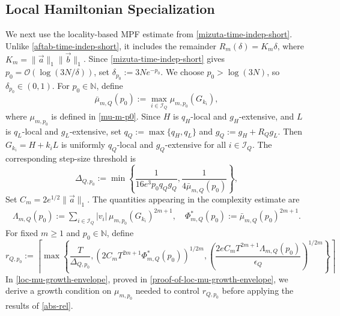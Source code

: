 \documentclass[10pt,reqno]{article}
\numberwithin{equation}{section}
\theoremstyle{plain}
\theoremstyle{definition}
\begin{document}
\subsection{Local Hamiltonian Specialization}\label{spec-mizuta}
We next use the locality-based MPF estimate from \cref{mizuta-time-indep-short}. Unlike \cref{aftab-time-indep-short}, it includes the remainder \(R_m(\delta)=K_m\delta\), where \(K_m=\|\vec a\|_1\|\vec b\|_1\). Since \cref{mizuta-time-indep-short} gives \(p_0=\mathcal O(\log(3N/\delta))\), set \(\delta_{p_0}:=3Ne^{-p_0}\). We choose \(p_0>\log(3N)\), so \(\delta_{p_0}\in(0,1)\). For \(p_0\in\mathbb N\), define
\begin{equation}\label{loc-mu-bar-def}
\bar\mu_{m,Q}(p_0) := \max_{i\in\mathcal I_Q} \mu_{m,p_0}(G_{k_i}), 
\end{equation}
where \(\mu_{m,p_0}\) is defined in \cref{mu-m-p0}.  Since \(H\) is \(q_H\)-local and \(g_H\)-extensive, and \(L\) is \(q_L\)-local and \(g_L\)-extensive, set \(q_Q := \max\{q_H,q_L\}\) and \(g_Q := g_H + R_Q g_L\). Then \(G_{k_i}=H+k_iL\) is uniformly \(q_Q\)-local and \(g_Q\)-extensive for all \(i\in\mathcal I_Q\). The corresponding step-size threshold is
\begin{equation}\label{loc-step-size}
\Delta_{Q,p_0}:=\min\left\{\frac{1}{16e^3p_0q_Qg_Q},\frac{1}{4\bar\mu_{m,Q}(p_0)}\right\},
\end{equation}
Set \(C_m=2e^{1/2}\|\vec a\|_1\). The quantities appearing in the complexity estimate are
\begin{align}\label{loc-Lambda-Phi-def}
\Lambda_{m,Q}(p_0):=\sum_{i\in\mathcal I_Q}
|v_i|\,\mu_{m,p_0}(G_{k_i})^{2m+1},
\quad 
\Phi^{\ast}_{m,Q}(p_0):= \bar\mu_{m,Q}(p_0)^{2m+1}.
\end{align}
For fixed \(m\ge1\) and \(p_0\in\mathbb N\), define \begin{equation}\label{loc-r-choice} r_{Q,p_0}:=\left\lceil\max\left\{\frac{T}{\Delta_{Q,p_0}}, \left( 2C_mT^{2m+1} \Phi^{\ast}_{m,Q}(p_0) \right)^{1/2m}, \left( \frac{ 2e C_m T^{2m+1} \Lambda_{m,Q}(p_0) }{\epsilon_Q} \right)^{1/2m} \right\} \right\rceil
\end{equation}
In \cref{loc-mu-growth-envelope}, proved in \cref{proof-of-loc-mu-growth-envelope}, we derive a growth condition on \(\mu_{m,p_0}\) needed to control \(r_{Q,p_0}\) before applying the results of \cref{abs-rel}.
\end{document}
